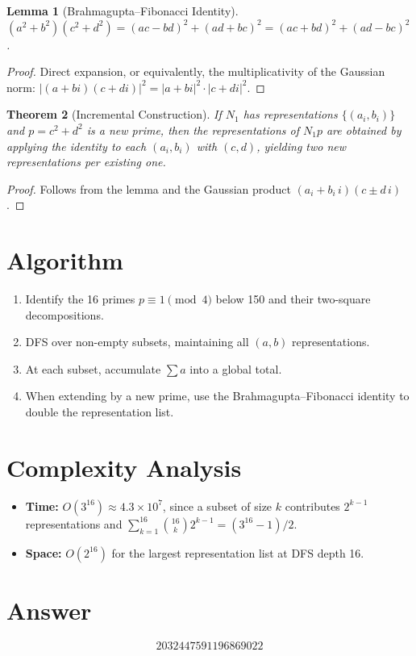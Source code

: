 \documentclass[12pt]{article}
\newtheorem{theorem}{Theorem}
\newtheorem{lemma}[theorem]{Lemma}
\begin{document}
\begin{lemma}[Brahmagupta--Fibonacci Identity]
$(a^2+b^2)(c^2+d^2) = (ac-bd)^2 + (ad+bc)^2 = (ac+bd)^2 + (ad-bc)^2$.
\end{lemma}

\begin{proof}
Direct expansion, or equivalently, the multiplicativity of the Gaussian norm: $|(a+bi)(c+di)|^2 = |a+bi|^2 \cdot |c+di|^2$.
\end{proof}

\begin{theorem}[Incremental Construction]
If $N_1$ has representations $\{(a_i,b_i)\}$ and $p = c^2+d^2$ is a new prime, then the representations of $N_1 p$ are obtained by applying the identity to each $(a_i,b_i)$ with $(c,d)$, yielding two new representations per existing one.
\end{theorem}

\begin{proof}
Follows from the lemma and the Gaussian product $(a_i+b_i\,i)(c \pm d\,i)$.
\end{proof}

\section{Algorithm}
\begin{enumerate}
    \item Identify the 16 primes $p \equiv 1\pmod{4}$ below 150 and their two-square decompositions.
    \item DFS over non-empty subsets, maintaining all $(a,b)$ representations.
    \item At each subset, accumulate $\sum a$ into a global total.
    \item When extending by a new prime, use the Brahmagupta--Fibonacci identity to double the representation list.
\end{enumerate}

\section{Complexity Analysis}
\begin{itemize}
    \item \textbf{Time:} $O(3^{16}) \approx 4.3 \times 10^7$, since a subset of size $k$ contributes $2^{k-1}$ representations and $\sum_{k=1}^{16}\binom{16}{k}2^{k-1} = (3^{16}-1)/2$.
    \item \textbf{Space:} $O(2^{16})$ for the largest representation list at DFS depth 16.
\end{itemize}

\section{Answer}

\[
\boxed{2032447591196869022}
\]
\end{document}
